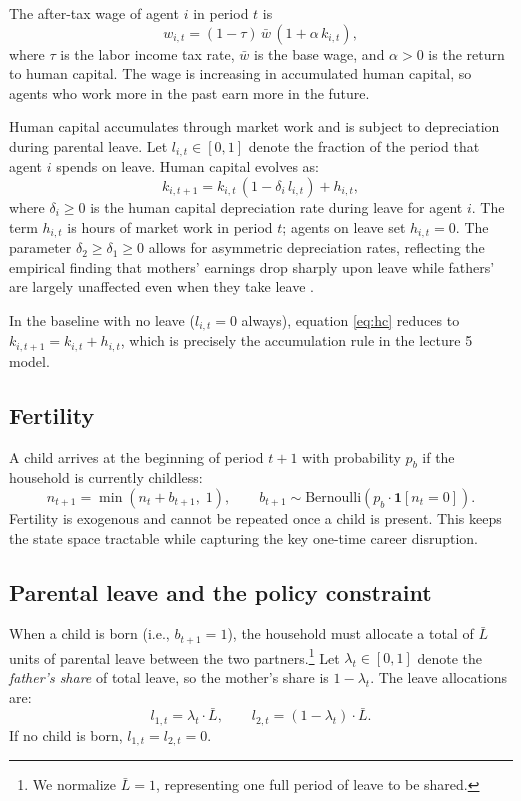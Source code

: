 The after-tax wage of agent $i$ in period $t$ is
\begin{equation}
    w_{i,t} = (1 - \tau)\,\bar{w}\,(1 + \alpha\, k_{i,t}),
    \label{eq:wage}
\end{equation}
where $\tau$ is the labor income tax rate, $\bar{w}$ is the base wage, and $\alpha > 0$ is the return to human capital. The wage is increasing in accumulated human capital, so agents who work more in the past earn more in the future.

Human capital accumulates through market work and is subject to depreciation during parental leave. Let $l_{i,t} \in [0,1]$ denote the fraction of the period that agent $i$ spends on leave. Human capital evolves as:
\begin{equation}
    k_{i,t+1} = k_{i,t}\,(1 - \delta_i\, l_{i,t}) + h_{i,t},
    \label{eq:hc}
\end{equation}
where $\delta_i \geq 0$ is the human capital depreciation rate during leave for agent $i$. The term $h_{i,t}$ is hours of market work in period $t$; agents on leave set $h_{i,t} = 0$. The parameter $\delta_2 \geq \delta_1 \geq 0$ allows for asymmetric depreciation rates, reflecting the empirical finding that mothers' earnings drop sharply upon leave while fathers' are largely unaffected even when they take leave \citep{patnaik2019reserving}.

In the baseline with no leave ($l_{i,t} = 0$ always), equation \eqref{eq:hc} reduces to $k_{i,t+1} = k_{i,t} + h_{i,t}$, which is precisely the accumulation rule in the lecture 5 model.

\subsection{Fertility}

A child arrives at the beginning of period $t+1$ with probability $p_b$ if the household is currently childless:
\[
    n_{t+1} = \min(n_t + b_{t+1},\; 1), \qquad b_{t+1} \sim \text{Bernoulli}(p_b \cdot \mathbf{1}[n_t = 0]).
\]
Fertility is exogenous and cannot be repeated once a child is present. This keeps the state space tractable while capturing the key one-time career disruption.

\subsection{Parental leave and the policy constraint}

When a child is born (i.e., $b_{t+1} = 1$), the household must allocate a total of $\bar{L}$ units of parental leave between the two partners.\footnote{We normalize $\bar{L} = 1$, representing one full period of leave to be shared.} Let $\lambda_t \in [0,1]$ denote the \textit{father's share} of total leave, so the mother's share is $1 - \lambda_t$. The leave allocations are:
\[
    l_{1,t} = \lambda_t \cdot \bar{L}, \qquad l_{2,t} = (1 - \lambda_t)\cdot\bar{L}.
\]
If no child is born, $l_{1,t} = l_{2,t} = 0$.

